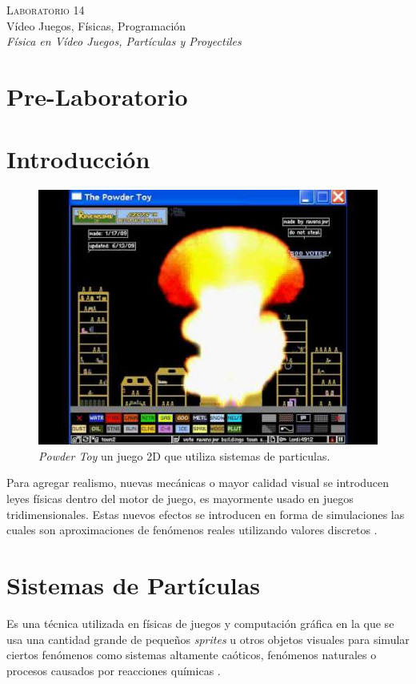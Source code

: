 \begin{center}
\textsc{\Large Laboratorio 14}~\\
{\large Vídeo Juegos, Físicas, Programación}~\\
\emph{Física en Vídeo Juegos, Partículas y Proyectiles}
\end{center}

\section{Pre-Laboratorio}

\section{Introducción}
\setlength\intextsep{0pt}
\begin{figure}
\includegraphics[width=\linewidth]{semana14/powdertoy.jpg}
\caption{\emph{Powder Toy} un juego 2D que utiliza sistemas de particulas.}
\label{fig:particles}
\end{figure}
Para agregar realismo, nuevas mecánicas o mayor calidad visual se introducen leyes físicas dentro del motor de juego, es mayormente usado en juegos tridimensionales. Estas nuevos efectos se introducen en forma de simulaciones las cuales son aproximaciones de fenómenos reales utilizando valores discretos \cite{ian_gamephysics}.

\section{Sistemas de Partículas}
Es una técnica utilizada en físicas de juegos y computación gráfica en la que se usa una cantidad grande de pequeños \emph{sprites} u otros objetos visuales para simular ciertos fenómenos como sistemas altamente caóticos, fenómenos naturales o procesos causados por reacciones químicas \cite{vanderburg_particlesystem}. 


